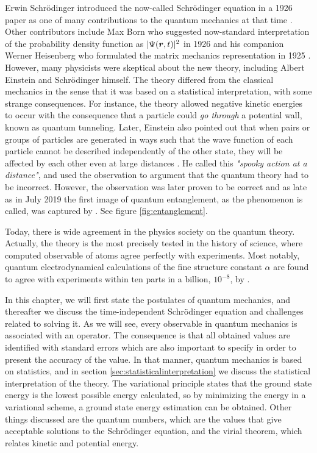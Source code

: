 Erwin Schrödinger introduced the now-called Schrödinger equation in a 1926 paper as one of many contributions to the quantum mechanics at that time \cite{schrodinger_undulatory_1926}. Other contributors include Max Born who suggested now-standard interpretation of the probability density function as $|\Psi(\boldsymbol{{r}},t)|^2$ in 1926 \cite{born_zur_1926} and his companion Werner Heisenberg who formulated the matrix mechanics representation in 1925 \cite{heisenberg_uber_1925}. However, many physicists were skeptical about the new theory, including Albert Einstein and Schrödinger himself. The theory differed from the classical mechanics in the sense that it was based on a statistical interpretation, with some strange consequences. For instance, the theory allowed negative kinetic energies to occur with the consequence that a particle could \textit{go through} a potential wall, known as quantum tunneling. Later, Einstein also pointed out that when pairs or groups of particles are generated in ways such that the wave function of each particle cannot be described independently of the other state, they will be affected by each other even at large distances \cite{einstein_can_1935}. He called this \textit{"spooky action at a distance"}, and used the observation to argument that the quantum theory had to be incorrect. However, the observation was later proven to be correct and as late as in July 2019 the first image of quantum entanglement, as the phenomenon is called, was captured by \citet{moreau_imaging_2019}. See figure \eqref{fig:entanglement}.

Today, there is wide agreement in the physics society on the quantum theory. Actually, the theory is the most precisely tested in the history of science, where computed observable of atoms agree perfectly with experiments. Most notably, quantum electrodynamical calculations of the fine structure constant $\alpha$ are found to agree with experiments within ten parts in a billion, $10^{-8}$, by \citet{odom_new_2006}.\bigskip

In this chapter, we will first state the postulates of quantum mechanics, and thereafter we discuss the time-independent Schrödinger equation and challenges related to solving it. As we will see, every observable in quantum mechanics is associated with an operator. The consequence is that all obtained values are identified with standard errors which are also important to specify in order to present the accuracy of the value. In that manner, quantum mechanics is based on statistics, and in section \ref{sec:statisticalinterpretation} we discuss the statistical interpretation of the theory. The variational principle states that the ground state energy is the lowest possible energy calculated, so by minimizing the energy in a variational scheme, a ground state energy estimation can be obtained. Other things discussed are the quantum numbers, which are the values that give acceptable solutions to the Schrödinger equation, and the virial theorem, which relates kinetic and potential energy. 

